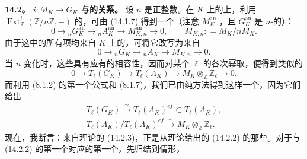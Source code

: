 \textbf{14.2。 $i:M_K\to G_K$ 与的关系。}
设 $n$ 是正整数。在 $K$ 上的上，利用 $\operatorname{Ext}_{\mathbb Z}^i(\mathbb Z/n\mathbb Z,-)$ 的，可由 (14.1.7) 得到一个（注意 $M_K^{\mathrm{an}}$ ，且 $G_K^{\mathrm{an}}$ 是 $n$-的）：
\[
0\longrightarrow{}_nG_K^{\mathrm{an}}\longrightarrow{}_nA_K^{\mathrm{an}}
\longrightarrow M_{K,n}^{\mathrm{an}}\longrightarrow0,
\qquad M_{K,n}\mathrel{\mathop:}=M_K/nM_K.
\]
由于这中的所有项均来自 $K$ 上的，可将它改写为来自
\begin{equation}\tag{14.2.1}
0\longrightarrow{}_nG_K\longrightarrow{}_nA_K\longrightarrow M_{K,n}\longrightarrow0.
\end{equation}
当 $n$ 变化时，这些具有应有的相容性，因而对某个 $\ell$ 的各次幂取，便得到类似的
\begin{equation}\tag{14.2.2}
0\longrightarrow T_\ell(G_K)\longrightarrow T_\ell(A_K)
\longrightarrow M_K\otimes_{\mathbb Z}\mathbb Z_\ell\longrightarrow0.
\end{equation}
而利用 (8.1.2) 的第一个公式和 (8.1.7)，我们已由纯方法得到这样一个，因为它们给出
\begin{equation}\tag{14.2.3}
\begin{gathered}
T_\ell(G_K)\xrightarrow\sim T_\ell(A_K)^{ef}\subset T_\ell(A_K),\\
T_\ell(A_K)/T_\ell(A_K)^{ef}\xrightarrow\sim M_K\otimes_{\mathbb Z}\mathbb Z_\ell.
\end{gathered}
\end{equation}
现在，我断言：来自理论的 (14.2.3)，正是从理论给出的 (14.2.2) 的那些。对于与 (14.2.2) 的第一个对应的第一个，先归结到情形，

